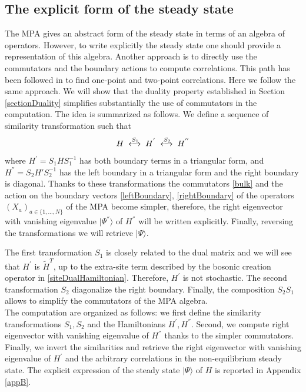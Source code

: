 \documentclass[10pt]{article}
\numberwithin{equation}{section}
\numberwithin{equation}{subsection}
\begin{document}
\subsection{The explicit form of the steady state}\label{subsection-exact}
The MPA gives an abstract form of the steady state in terms of an algebra of operators. However, to write explicitly the steady state one should provide a representation of this algebra. Another approach is to directly use the commutators and the boundary actions to compute correlations. This path has been followed in \cite{vanicat2017exact} to find one-point and two-point correlations. 
Here we follow the same approach. We will show that the duality property established in Section \ref{sectionDuality} simplifies substantially the  use of commutators in the
computation. The idea is summarized as follows. We define a sequence of similarity transformation such that 
\begin{equation}
	H\;\xleftrightarrow{S_{1}}\;H^{'}\;\xleftrightarrow{S_{2}}\;H^{''}
\end{equation} 
where $H^{'}= S_{1} H S_{1}^{-1} $ has both boundary terms in a triangular form, and $H^{''} = S_{2}H' S_{2}^{-1}$ has the left boundary in a triangular form and the right boundary is diagonal. Thanks to these transformations the commutators \eqref{bulk} and the action on the boundary vectors \eqref{leftBoundary}, \eqref{rightBoundary} of the operators $(X_{a})_{a\in\{1,\ldots,N\}}$ of the MPA become simpler, therefore, the right eigenvector with vanishing eigenvalue $|\Psi^{''}\rangle$ of $H^{''}$ will be written explicitly. Finally, reversing the transformations we will retrieve $|\Psi\rangle$.

The first transformation $S_{1}$ is closely related to the dual matrix and we will see that $H^{'}$ is $\widetilde{H}^{T}$, up to the extra-site term described by the bosonic creation operator in \eqref{siteDualHamiltonian}. Therefore, $H^{'}$ is not stochastic. The second transformation $S_{2}$ diagonalize the right boundary. Finally, the composition  $S_{2} S_{1}$ allows to simplify the commutators of the MPA algebra. \\

The computation are organized as follows: we first define the similarity transformations $S_{1},S_{2}$ and the Hamiltonians $H^{'},H^{''}$. Second, we compute right eigenvector with vanishing eigenvalue of $H^{''}$ thanks to the simpler commutators. Finally, we invert the similarities and retrieve the right eigenvector with vanishing eigenvalue of $H^{'}$ and  the arbitrary correlations in the non-equilibrium steady state. The explicit expression of the steady state $|\Psi\rangle$ of $H$ is reported in Appendix \ref{appB}. 
\end{document}
